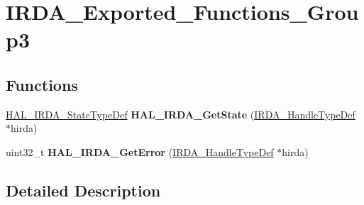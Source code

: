 \hypertarget{group___i_r_d_a___exported___functions___group3}{}\section{I\+R\+D\+A\+\_\+\+Exported\+\_\+\+Functions\+\_\+\+Group3}
\label{group___i_r_d_a___exported___functions___group3}
\subsection*{Functions}
\begin{DoxyCompactItemize}
\item 
\hyperlink{group___i_r_d_a___exported___types_gab3e65b75c9d4ae39bc50a31222509e1e}{H\+A\+L\+\_\+\+I\+R\+D\+A\+\_\+\+State\+Type\+Def} {\bfseries H\+A\+L\+\_\+\+I\+R\+D\+A\+\_\+\+Get\+State} (\hyperlink{struct_i_r_d_a___handle_type_def}{I\+R\+D\+A\+\_\+\+Handle\+Type\+Def} $\ast$hirda)\hypertarget{group___i_r_d_a___exported___functions___group3_ga66ac92837c0eb309ae8c9513b83f5fe0}{}\label{group___i_r_d_a___exported___functions___group3_ga66ac92837c0eb309ae8c9513b83f5fe0}

\item 
uint32\+\_\+t {\bfseries H\+A\+L\+\_\+\+I\+R\+D\+A\+\_\+\+Get\+Error} (\hyperlink{struct_i_r_d_a___handle_type_def}{I\+R\+D\+A\+\_\+\+Handle\+Type\+Def} $\ast$hirda)\hypertarget{group___i_r_d_a___exported___functions___group3_ga5401e767569d4996aa48c0a81b645b44}{}\label{group___i_r_d_a___exported___functions___group3_ga5401e767569d4996aa48c0a81b645b44}

\end{DoxyCompactItemize}


\subsection{Detailed Description}
